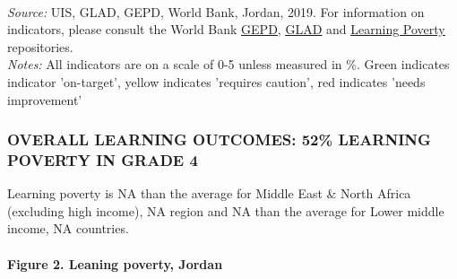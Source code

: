 \documentclass[twocolumn]{article}
\let\oldparagraph\paragraph
\renewcommand{\paragraph}[1]{\oldparagraph{#1}\mbox{}}
\begin{document}
\begin{table}[H]
\\
\color{darkgray}\scriptsize{\textit{Source:} UIS, GLAD, GEPD, World Bank, Jordan, 2019. For information on indicators, please consult the World Bank \href{https://github.com/worldbank/GEPD}{\underline{GEPD}}, \href{https://github.com/worldbank/GLAD}{\underline{GLAD}} and \href{https://github.com/worldbank/LearningPoverty}{\underline{Learning Poverty}} repositories.}\\
\color{darkgray}\scriptsize{\textit{Notes:} All indicators are on a scale of 0-5 unless measured in \%. Green indicates indicator 'on-target', yellow indicates 'requires caution', red indicates 'needs improvement'}
\end{table}
\raggedbottom

\hypertarget{overall-learning-outcomes-52-learning-poverty-in-grade-4}{%
\subsubsection{\texorpdfstring{\textbf{OVERALL LEARNING OUTCOMES: 52\%
LEARNING POVERTY IN GRADE
4}}{OVERALL LEARNING OUTCOMES: 52\% LEARNING POVERTY IN GRADE 4}}\label{overall-learning-outcomes-52-learning-poverty-in-grade-4}}

Learning poverty is NA than the average for Middle East \& North Africa
(excluding high income), NA region and NA than the average for Lower
middle income, NA countries.

\hypertarget{figure-2.-leaning-poverty-jordan}{%
\paragraph{Figure 2. Leaning poverty,
Jordan}\label{figure-2.-leaning-poverty-jordan}}
\end{document}
